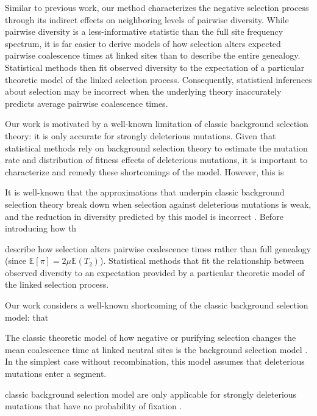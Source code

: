 \documentclass[11pt]{article}
\newcommand{\E}{\mathbb{E}}
\begin{document}
Similar to previous work, our method characterizes the negative selection
process through its indirect effects on neighboring levels of pairwise
diversity. While pairwise diversity is a less-informative statistic than the
full site frequency spectrum, it is far easier to derive models of how
selection alters expected pairwise coalescence times at linked sites than to
describe the entire genealogy. Statistical methods then fit observed diversity
to the expectation of a particular theoretic model of the linked selection
process. Consequently, statistical inferences about selection may be incorrect
when the underlying theory inaccurately predicts average pairwise coalescence
times.

Our work is motivated by a well-known limitation of classic background
selection theory: it is only accurate for strongly deleterious mutations. Given
that statistical methods rely on background selection theory to estimate the
mutation rate and distribution of fitness effects of deleterious mutations, it
is important to characterize and remedy these shortcomings of the model.
However, this is 


It is well-known that the approximations that underpin classic background
selection theory
\parencite{Charlesworth1993-gb,Nordborg1996-nq,Hudson1994-oh,Hudson1995-pt}
break down when selection against deleterious mutations is weak, and the
reduction in diversity predicted by this model is incorrect
\parencite{McVean2000-bt,Good2013-lp,Gordo2002-dr}. Before introducing how th 



describe how selection alters pairwise coalescence times rather than full
genealogy (since $\E[\pi] = 2\mu \E(T_2)$). Statistical methods that fit the
relationship between observed diversity to an expectation provided by a
particular theoretic model of the linked selection process. 

Our work considers a well-known
shortcoming of the classic background selection model: that 

The classic theoretic model of how negative or purifying selection changes the
mean coalescence time at linked neutral sites is the background selection model
\parencite{Charlesworth1993-gb}. In the simplest case without recombination,
this model assumes that deleterious mutations enter a segment.

classic background selection model are only applicable for strongly deleterious
mutations that have no probability of fixation
\parencite{Good2014-yz,Gordo2002-dr,Charlesworth2013-kl}.
\end{document}
